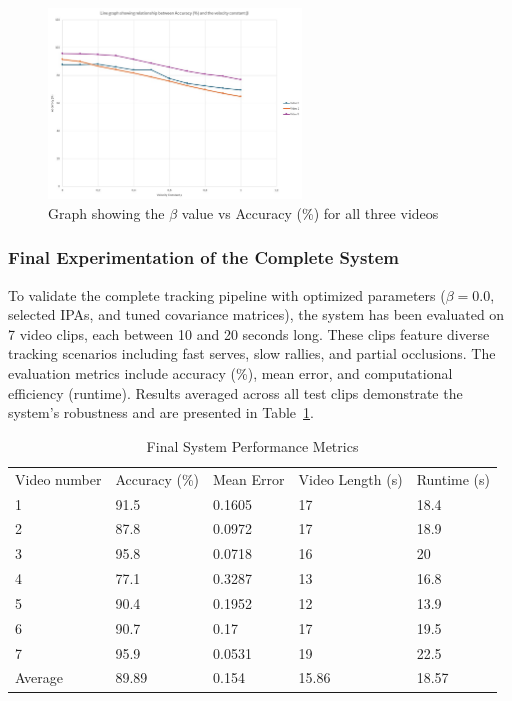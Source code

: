 \documentclass[12pt,a4paper]{article}
\begin{document}
\begin{figure}[H]
	\centering
	\includegraphics[width=0.6\textwidth]{lineGraphBeta.jpg}
	\caption{Graph showing the $\beta$ value vs Accuracy (\%) for all three videos}
	\label{fig:betaVsAccuracy}
\end{figure}

\subsubsection{Final Experimentation of the Complete System}
To validate the complete tracking pipeline with optimized parameters ($\beta=0.0$, selected IPAs, and tuned covariance matrices), the system has been evaluated on 7 video clips, each between 10 and 20 seconds long. These clips feature diverse tracking scenarios including fast serves, slow rallies, and partial occlusions. The evaluation metrics include accuracy (\%), mean error, and computational efficiency (runtime). Results averaged across all test clips demonstrate the system's robustness and are presented in Table~\ref{tab:finalExp}.

\begin{table}[H]
\centering
\caption{Final System Performance Metrics}
\label{tab:finalExp}
\begin{tabular}{p{2.5cm} p{2.5cm} p{2.5cm} p{2cm} p{2cm}}
\toprule
Video number & Accuracy (\%) & Mean Error & Video Length (s) & Runtime (s) \\
1 & 91.5 & 0.1605 & 17 & 18.4 \\
2 & 87.8 & 0.0972 & 17 & 18.9 \\
3 & 95.8 & 0.0718 & 16 & 20 \\
4 & 77.1 & 0.3287 & 13 & 16.8 \\
5 & 90.4 & 0.1952 & 12 & 13.9 \\
6 & 90.7 & 0.17 & 17 & 19.5 \\
7 & 95.9 & 0.0531 & 19 & 22.5 \\
\bottomrule
Average & 89.89 & 0.154 & 15.86 & 18.57 \\
\bottomrule
\end{tabular}
\end{table}
\end{document}
